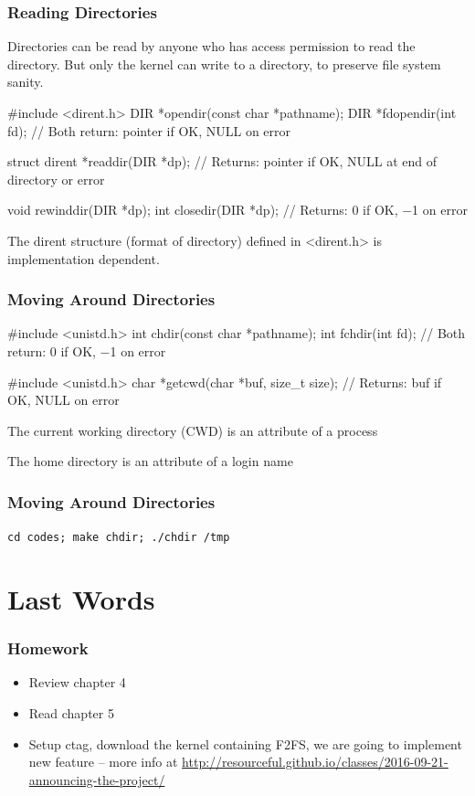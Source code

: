 \documentclass[newPxFont,sthlmFooter,nooffset]{beamer}
\begin{document}
\begin{frame}[containsverbatim,t]
  \frametitle{Reading Directories}
Directories can be read by anyone who has access permission to read the directory. But only the kernel can write to a directory, to preserve file system sanity. 

\begin{codedef}
#include <dirent.h>
DIR *opendir(const char *pathname); 
DIR *fdopendir(int fd);
// Both return: pointer if OK, NULL on error 

struct dirent *readdir(DIR *dp); 
// Returns: pointer if OK, NULL at end of directory or error

void rewinddir(DIR *dp);
int closedir(DIR *dp);
// Returns: 0 if OK, −1 on error 
\end{codedef}


The dirent structure (format of directory) defined in <dirent.h> is implementation dependent.


\end{frame}



\begin{frame}[containsverbatim,t]
  \frametitle{Moving Around Directories}

\begin{codedef}
#include <unistd.h>
int chdir(const char *pathname); 
int fchdir(int fd);
// Both return: 0 if OK, −1 on error

#include <unistd.h>
char *getcwd(char *buf, size_t size);
// Returns: buf if OK, NULL on error
\end{codedef}

The current working directory (CWD) is an attribute of a process

The home directory is an attribute of a login name
\end{frame}



\begin{frame}[containsverbatim,t]
  \frametitle{Moving Around Directories}


\bigskip

\texttt{cd codes; make chdir; ./chdir /tmp}


\end{frame}

\section{Last Words}
\begin{frame}[t]
  \frametitle{Homework}

  \begin{itemize}
  \item Review chapter 4
  \item Read chapter 5
  \item Setup ctag, download the kernel containing F2FS, we are going to implement new feature -- more info at \url{http://resourceful.github.io/classes/2016-09-21-announcing-the-project/}
  \end{itemize}
\end{frame}
\end{document}

